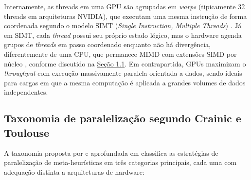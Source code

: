 Internamente, as threads em uma GPU são agrupadas em \emph{warps}
(tipicamente 32 threads em arquiteturas NVIDIA), que executam uma mesma
instrução de forma coordenada segundo o modelo SIMT (\emph{Single
  Instruction, Multiple Threads}) \autocite{nvidia2024cuda}. Já em SIMT, cada \emph{thread} possui seu próprio estado lógico, mas o hardware agenda grupos de \emph{threads} em passo coordenado enquanto não há divergência, diferentemente de uma CPU, que permanece MIMD com extensões SIMD por núcleo \autocite{flynn1972taxonomy}, conforme discutido na \hyperref[sec-11-contexto-e-motivacao]{Seção 1.1}.
Em contrapartida, GPUs maximizam o \emph{throughput} com execução massivamente paralela orientada a dados, sendo ideais para cargas em que a mesma computação é aplicada a grandes volumes de dados independentes.

\subsection{Taxonomia de paralelização segundo Crainic e Toulouse}\label{sec-261-taxonomia-paralelizacao}

A taxonomia proposta por \textcite{crainic2003parallel} e aprofundada em
\textcite{crainic2010parallel} classifica as estratégias de
paralelização de meta-heurísticas em três categorias principais, cada
uma com adequação distinta a arquiteturas de hardware:

